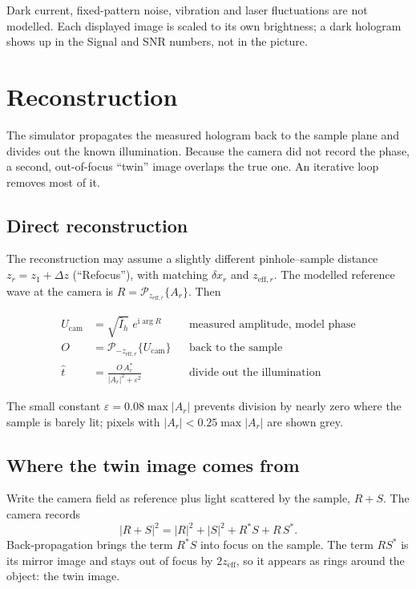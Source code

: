 \documentclass[12pt,a4paper]{article}
\newcommand{\Prop}{\mathcal{P}}
\newcommand{\ui}{\mathrm{i}}
\begin{document}
\begin{limit}
Dark current, fixed-pattern noise, vibration and laser fluctuations are not modelled. Each displayed image is scaled to its own brightness; a dark hologram shows up in the Signal and SNR numbers, not in the picture.
\end{limit}

\section{Reconstruction}
\label{sec:recon}

\begin{short}
The simulator propagates the measured hologram back to the sample plane and divides out the known
illumination. Because the camera did not record the phase, a second, out-of-focus ``twin'' image
overlaps the true one. An iterative loop removes most of it.
\end{short}

\subsection{Direct reconstruction}
The reconstruction may assume a slightly different pinhole--sample distance $z_r=z_1+\Delta z$ (``Refocus''), with matching $\delta x_r$ and $z_{\mathrm{eff},r}$. The modelled reference wave at the camera is $R=\Prop_{z_{\mathrm{eff},r}}\{A_r\}$. Then
\begin{keyeq}
\begin{align}
U_\mathrm{cam}&=\sqrt{\hat I_h}\;e^{\ui\arg R}
&&\text{measured amplitude, model phase}\\
O&=\Prop_{-z_{\mathrm{eff},r}}\{U_\mathrm{cam}\}
&&\text{back to the sample}\\
\hat t&=\frac{O\,A_r^{*}}{|A_r|^2+\varepsilon^2}
&&\text{divide out the illumination}
\end{align}
\end{keyeq}
The small constant $\varepsilon=0.08\max|A_r|$ prevents division by nearly zero where the sample is barely lit; pixels with $|A_r|<0.25\max|A_r|$ are shown grey.

\subsection{Where the twin image comes from}
Write the camera field as reference plus light scattered by the sample, $R+S$. The camera records
\begin{equation}
|R+S|^2=|R|^2+|S|^2+R^{*}S+R\,S^{*}.
\end{equation}
Back-propagation brings the term $R^{*}S$ into focus on the sample. The term $RS^{*}$ is its mirror image and stays out of focus by $2z_\mathrm{eff}$, so it appears as rings around the object: the twin image.
\end{document}
